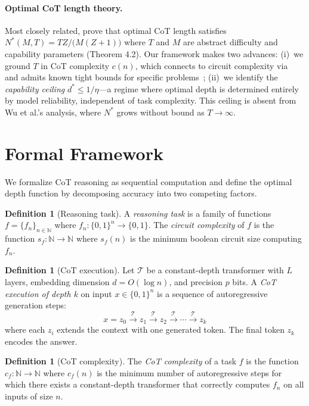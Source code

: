 \documentclass{article}
\theoremstyle{definition}
\newtheorem{definition}[theorem]{Definition}
\theoremstyle{remark}
\newcommand{\depth}{d^*}       %
\newcommand{\noise}{\eta}      %
\newcommand{\ccot}{c}          %
\newcommand{\N}{\mathbb{N}}
\begin{document}
\paragraph{Optimal CoT length theory.} Most closely related, \citet{wu2025when} prove that optimal CoT length satisfies $N^*(M,T) = TZ/\bigl(M(Z+1)\bigr)$ where $T$ and $M$ are abstract difficulty and capability parameters (Theorem 4.2). Our framework makes two advances: (i)~we ground $T$ in CoT complexity $\ccot(n)$, which connects to circuit complexity via~\citet{li2024chain} and admits known tight bounds for specific problems~\cite{amiri2025lower,barcelo2025ehrenfeucht}; (ii)~we identify the \emph{capability ceiling} $\depth \leq 1/\noise$---a regime where optimal depth is determined entirely by model reliability, independent of task complexity. This ceiling is absent from Wu et al.'s analysis, where $N^*$ grows without bound as $T \to \infty$.

\section{Formal Framework}
\label{sec:framework}

We formalize CoT reasoning as sequential computation and define the optimal depth function by decomposing accuracy into two competing factors.

\begin{definition}[Reasoning task]
\label{def:task}
A \emph{reasoning task} is a family of functions $f = \{f_n\}_{n \in \N}$ where $f_n : \{0,1\}^n \to \{0,1\}$. The \emph{circuit complexity} of $f$ is the function $s_f : \N \to \N$ where $s_f(n)$ is the minimum boolean circuit size computing $f_n$.
\end{definition}

\begin{definition}[CoT execution]
\label{def:cot}
Let $\mathcal{T}$ be a constant-depth transformer with $L$ layers, embedding dimension $d = O(\log n)$, and precision $p$ bits. A \emph{CoT execution of depth $k$} on input $x \in \{0,1\}^n$ is a sequence of autoregressive generation steps:
\[
x = z_0 \xrightarrow{\mathcal{T}} z_1 \xrightarrow{\mathcal{T}} z_2 \xrightarrow{\mathcal{T}} \cdots \xrightarrow{\mathcal{T}} z_k
\]
where each $z_i$ extends the context with one generated token. The final token $z_k$ encodes the answer.
\end{definition}

\begin{definition}[CoT complexity]
\label{def:cot-complexity}
The \emph{CoT complexity} of a task $f$ is the function $\ccot_f : \N \to \N$ where $\ccot_f(n)$ is the minimum number of autoregressive steps for which there exists a constant-depth transformer that correctly computes $f_n$ on all inputs of size $n$.
\end{definition}
\end{document}
